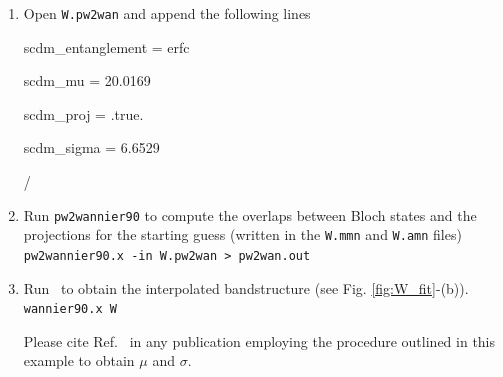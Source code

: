 \documentclass[a4paper,11pt,twoside]{article}
\begin{document}
\begin{enumerate}
	{\tt y = 0.5 * erfc( ( x - A0 ) / A1 )}  \\

Select 2 as number of parameters, give 40 as initial condition for {\tt A0} and 7 for {\tt A1}. Click {\tt Apply}. A new window should pop up with the stats of the fitting. In particular you should find a {\tt Correlation coefficient} of 0.96 and a value of $39.9756$ for {\tt A0} and $6.6529$ for {\tt A1}. These are the value of $\mu_{fit}$ and $\sigma_{fit}$ we are going to use for the SCDM method. In particular, $\mu_{SCDM} = \mu_{fit} - 3\sigma_{fit} = 20.0169$ eV and $\sigma_{SCDM} = \sigma_{fit} = 6.6529$ eV. The motivation for this specific choice of $\mu_{fit}$ and $\sigma_{fit}$ may be found in Ref.~\cite{Vitale2019automated}, where the authors also show validation of this approach on a dataset of 200 materials. You should now see the fitting function, as well as the projectabilities, in the graph (see Fig. \ref{fig:W_fit}-(a)).\\

        \item Open {\tt W.pw2wan} and append the following lines
	{\tt 
	
	scdm\_entanglement = erfc

  	scdm\_mu =  20.0169

  	scdm\_proj = .true.

  	scdm\_sigma =   6.6529

 	/}

	\item Run {\tt pw2wannier90} to compute the overlaps between Bloch
	states and the projections for the starting guess (written in the
	{\tt W.mmn} and {\tt  W.amn} files)\\
	{\tt pw2wannier90.x -in W.pw2wan > pw2wan.out}
	
	\item Run \wannier\ to obtain the interpolated bandstructure (see Fig. \ref{fig:W_fit}-(b)).\\
	{\tt wannier90.x W}

Please cite Ref.~\cite{Vitale2019automated} in any publication employing the procedure outlined in this example to obtain $\mu$ and $\sigma$.
\end{enumerate}
\end{document}
